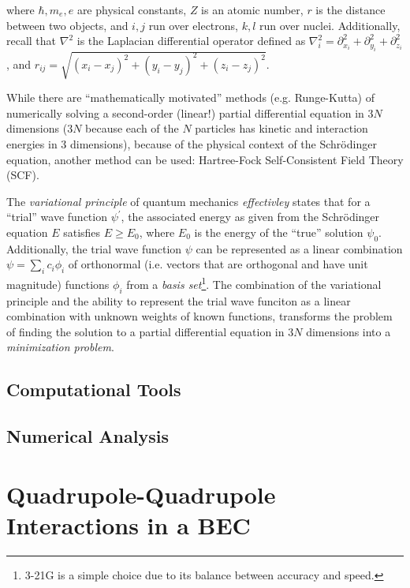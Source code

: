 \documentclass{report}
\begin{document}
            where $\hbar, m_e, e$ are physical constants, $Z$ is an atomic number, $r$ is the distance between two objects, and $i,j$ run over electrons, $k,l$ run over nuclei.  Additionally, recall that $\nabla^2$ is the Laplacian differential operator defined as $\nabla_i^2 = \partial_{x_i}^2 + \partial_{y_i}^2 + \partial_{z_i}^2$, and $r_{ij} = \sqrt{(x_i - x_j)^2 + (y_i - y_j)^2 + (z_i - z_j)^2}$.

            While there are ``mathematically motivated'' methods (e.g. Runge-Kutta) of numerically solving a second-order (linear!) partial differential equation in $3N$ dimensions ($3N$ because each of the $N$ particles has kinetic and interaction energies in 3 dimensions), because of the physical context of the Schr{\"o}dinger equation, another method can be used: Hartree-Fock Self-Consistent Field Theory (SCF).

            The \emph{variational principle} of quantum mechanics \textit{effectivley} states that for a ``trial'' wave function $\psi^\prime$, the associated energy as given from the Schr{\"o}dinger equation $E$ satisfies $E \geq E_0$, where $E_0$ is the energy of the ``true'' solution $\psi_0$.  Additionally, the trial wave function $\psi$ can be represented as a linear combination $\psi = \sum_i c_i \phi_i$ of orthonormal (i.e. vectors that are orthogonal and have unit magnitude) functions $\phi_i$ from a \emph{basis set}\footnote{3-21G is a simple choice due to its balance between accuracy and speed\cite{cramer2013essentials}.}.  The combination of the variational principle and the ability to represent the trial wave funciton as a linear combination with unknown weights of known functions, transforms the problem of finding the solution to a partial differential equation in $3N$ dimensions into a \emph{minimization problem}.

        \subsection{Computational Tools}

        \subsection{Numerical Analysis}

    \section{Quadrupole-Quadrupole Interactions in a BEC}
\end{document}

